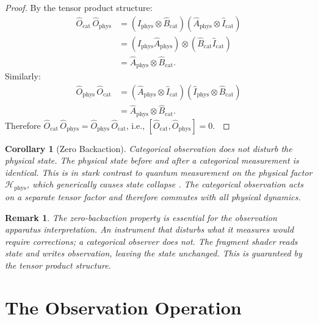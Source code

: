 \documentclass[11pt,twocolumn,a4paper]{article}
\newtheorem{corollary}[theorem]{Corollary}
\newtheorem{remark}[theorem]{Remark}
\newcommand{\Ocat}{\hat{O}_{\mathrm{cat}}}
\newcommand{\Ophys}{\hat{O}_{\mathrm{phys}}}
\newcommand{\Hilb}{\mathcal{H}}
\begin{document}
\begin{proof}
By the tensor product structure:
\begin{align}
\Ocat \, \Ophys
&= (\hat{I}_{\mathrm{phys}} \otimes \hat{B}_{\mathrm{cat}})
   (\hat{A}_{\mathrm{phys}} \otimes \hat{I}_{\mathrm{cat}})
\nonumber\\
&= (\hat{I}_{\mathrm{phys}} \hat{A}_{\mathrm{phys}})
   \otimes (\hat{B}_{\mathrm{cat}} \hat{I}_{\mathrm{cat}})
\nonumber\\
&= \hat{A}_{\mathrm{phys}}
   \otimes \hat{B}_{\mathrm{cat}}.
\label{eq:comm-forward}
\end{align}
Similarly:
\begin{align}
\Ophys \, \Ocat
&= (\hat{A}_{\mathrm{phys}} \otimes \hat{I}_{\mathrm{cat}})
   (\hat{I}_{\mathrm{phys}} \otimes \hat{B}_{\mathrm{cat}})
\nonumber\\
&= \hat{A}_{\mathrm{phys}}
   \otimes \hat{B}_{\mathrm{cat}}.
\label{eq:comm-reverse}
\end{align}
Therefore $\Ocat \, \Ophys = \Ophys \, \Ocat$, i.e.,
$[\Ocat, \Ophys] = 0$. $\qedhere$
\end{proof}

\begin{corollary}[Zero Backaction]
\label{cor:zero-backaction}
Categorical observation does not disturb the physical state. The
physical state before and after a categorical measurement is
identical. This is in stark contrast to quantum measurement on the
physical factor $\Hilb_{\mathrm{phys}}$, which generically causes
state collapse \citep{vonneumann1932}. The categorical observation
acts on a separate tensor factor and therefore commutes with all
physical dynamics.
\end{corollary}

\begin{remark}
The zero-backaction property is essential for the observation
apparatus interpretation. An instrument that disturbs what it
measures would require corrections; a categorical observer does not.
The fragment shader reads state and writes observation, leaving the
state unchanged. This is guaranteed by the tensor product structure.
\end{remark}



\section{The Observation Operation}
\label{sec:observation}
\end{document}
